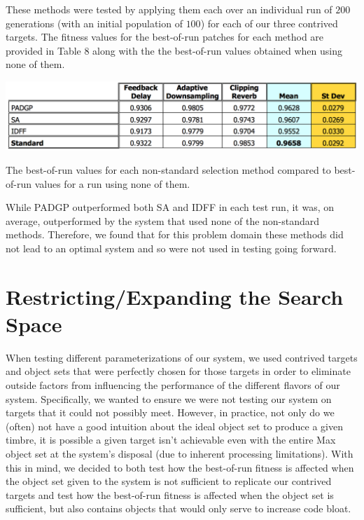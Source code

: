 \documentclass[12pt]{report} 	%
\numberwithin{figure}{chapter}
\numberwithin{table}{chapter}
\numberwithin{equation}{chapter}
\begin{document}
\begin{flushleft}
These methods were tested by applying them each over an individual run of $200$ generations (with an initial population of $100$) for each of our three contrived targets. The fitness values for the best-of-run patches for each method are provided in Table 8 along with the the best-of-run values obtained when using none of them.
\begin{table}[h!]
\begin{center}
\includegraphics[scale=0.6,width=\linewidth]{NonStandardSelectionTable}
\caption[Non-standard selection best-of-run values]{The best-of-run values for each non-standard selection method compared to best-of-run values for a run using none of them.}
\end{center}
\end{table}
While PADGP outperformed both SA and IDFF in each test run, it was, on average, outperformed by the system that used none of the non-standard methods. Therefore, we found that for this problem domain these methods did not lead to an optimal system and so were not used in testing going forward.

\section{Restricting/Expanding the Search Space}
When testing different parameterizations of our system, we used contrived targets and object sets that were perfectly chosen for those targets in order to eliminate outside factors from influencing the performance of the different flavors of our system. Specifically, we wanted to ensure we were not testing our system on targets that it could not possibly meet. However, in practice, not only do we (often) not have a good intuition about the ideal object set to produce a given timbre, it is possible a given target isn't achievable even with the entire Max object set at the system's disposal (due to inherent processing limitations). With this in mind, we decided to both test how the best-of-run fitness is affected when the object set given to the system is not sufficient to replicate our contrived targets and test how the best-of-run fitness is affected when the object set is sufficient, but also contains objects that would only serve to increase code bloat.


\end{flushleft}
\end{document}
